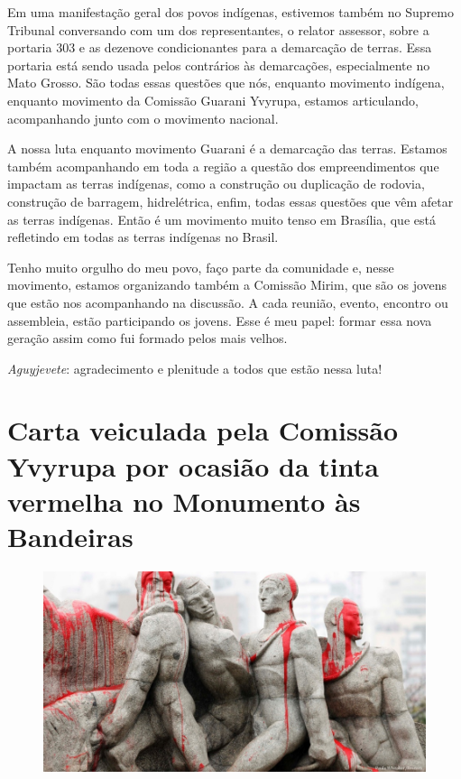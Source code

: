 Em uma manifestação geral dos povos indígenas, estivemos também no
Supremo Tribunal conversando com um dos representantes, o relator
assessor, sobre a portaria 303 e as dezenove condicionantes para a
demarcação de terras. Essa portaria está sendo usada pelos contrários
às demarcações, especialmente no Mato Grosso. São todas essas questões
que nós, enquanto movimento indígena, enquanto movimento da Comissão
Guarani Yvyrupa, estamos articulando, acompanhando junto com o
movimento nacional.

A nossa luta enquanto movimento Guarani é a demarcação das terras.
Estamos também acompanhando em toda a região a questão dos
empreendimentos que impactam as terras indígenas, como a construção ou
duplicação de rodovia, construção de barragem, hidrelétrica, enfim,
todas essas questões que vêm afetar as terras indígenas. Então é um
movimento muito tenso em Brasília, que está refletindo em todas as
terras indígenas no Brasil.

Tenho muito orgulho do meu povo, faço parte da comunidade e, nesse
movimento, estamos organizando também a Comissão Mirim, que são os
jovens que estão nos acompanhando na discussão. A cada reunião, evento,
encontro ou assembleia, estão participando os jovens. Esse é meu papel:
formar essa nova geração assim como fui formado pelos mais velhos. 

\emph{Aguyjevete}: agradecimento e plenitude a todos que estão nessa luta!

\chapter{Carta veiculada pela Comissão Yvyrupa por ocasião da tinta
vermelha no Monumento às Bandeiras}
\begin{figure}[h]
 \includegraphics[width=\textwidth]{./img/GUARANIS-img2.jpg}	
\end{figure}


